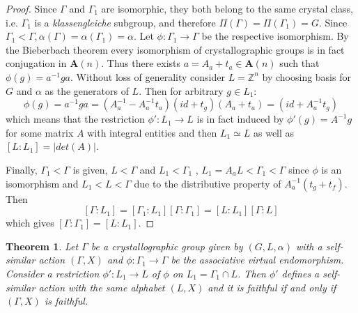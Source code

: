 \documentclass[a4paper,12pt]{amsart}
\newtheorem{theorem}{Theorem}
\theoremstyle{definition}
\begin{document}
	\begin{proof}
		
		Since $\Gamma$ and $\Gamma_1$ are isomorphic, they both belong to the same crystal class, i.e. $\Gamma_1$ is a \textit{klassengleiche} subgroup, and therefore $\Pi(\Gamma) = \Pi(\Gamma_1) = G$. Since $\Gamma_1 < \Gamma, \alpha(\Gamma) = \alpha(\Gamma_1) = \alpha$.  Let $\phi : \Gamma_1 \rightarrow \Gamma$ be the respective isomorphism. By the Bieberbach theorem every isomorphism of crystallographic groups is in fact conjugation in $\mathbf{A}(n)$. Thus there exists $a = A_a + t_a \in \mathbf{A}(n)$ such that $\phi(g) = a^{-1} g a$. Without loss of generality consider $L = \mathbb{Z}^n$ by choosing basis for $G$ and $\alpha$ as the generators of $L$. 
		Then for arbitrary $g \in L_1$:
		\begin{equation} \label{eq: conjugation on translation}
			\phi(g) = a^{-1}ga = (A_a^{-1} - A_a^{-1}t_a)(id + t_g)(A_a + t_a) = (id + A_a^{-1}t_g)	
		\end{equation}
		which means that the restriction $\phi' : L_1 \rightarrow L$ is in fact induced by $\phi'(g) = A^{-1}g$ for some matrix $A$ with integral entities and then $L_1 \simeq L$ as well as $[L : L_1] = |det(A)|$.
		
		Finally, $\Gamma_1 < \Gamma$ is given, $L < \Gamma$ and $L_1 < \Gamma_1$ , $L_1 = A_a L < \Gamma_1 < \Gamma$ since $\phi$ is an isomorphism and $L_1 < L < \Gamma$ due to the distributive property of $A^{-1}_a (t_g + t_f)$. Then 
		$$
		[\Gamma : L_1] = [\Gamma_1 : L_1][\Gamma : \Gamma_1] =
		[L : L_1][\Gamma : L]
		$$
		which gives $[\Gamma : \Gamma_1] =[L : L_1]$.
		
	\end{proof}
	
	
	\begin{theorem}	\label{theorem: cryst vs lattice}
		Let $\Gamma$ be a crystallographic group given by $(G, L, \alpha)$ with a self-similar action $(\Gamma, X)$ and $\phi : \Gamma_1 \rightarrow \Gamma$ be the associative virtual endomorphism. Consider a restriction $\phi' : L_1 \rightarrow L$ of $\phi$ on $L_1 = \Gamma_1 \cap L$. Then $\phi'$ defines a self-similar action with the same alphabet $(L, X)$ and it is faithful if and only if $(\Gamma, X)$ is faithful.  
	\end{theorem}
	
\end{document}
